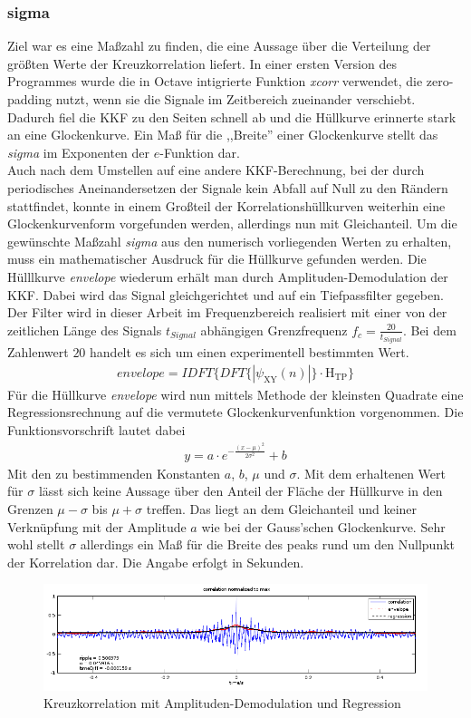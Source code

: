 \subsubsection{sigma}
Ziel war es eine Maßzahl zu finden, die eine Aussage über die Verteilung der größten Werte der Kreuzkorrelation liefert. In einer ersten Version des Programmes wurde die in Octave intigrierte Funktion \textit{xcorr} verwendet, die zero-padding nutzt, wenn sie die Signale im Zeitbereich zueinander verschiebt. Dadurch fiel die KKF zu den Seiten schnell ab und die Hüllkurve erinnerte stark an eine Glockenkurve. Ein Maß für die ,,Breite'' einer Glockenkurve stellt das \textit{sigma} im Exponenten der $e$-Funktion dar. 
\\Auch nach dem Umstellen auf eine andere KKF-Berechnung, bei der durch periodisches Aneinandersetzen der Signale kein Abfall auf Null zu den Rändern stattfindet, konnte in einem Großteil der Korrelationshüllkurven weiterhin eine Glockenkurvenform vorgefunden werden, allerdings nun mit Gleichanteil. Um die gewünschte Maßzahl \textit{sigma} aus den numerisch vorliegenden Werten zu erhalten, muss ein mathematischer Ausdruck für die Hüllkurve gefunden werden. Die Hülllkurve \textit{envelope} wiederum erhält man durch Amplituden-Demodulation der KKF. Dabei wird das Signal gleichgerichtet und auf ein Tiefpassfilter gegeben. Der Filter wird in dieser Arbeit im Frequenzbereich realisiert mit einer von der zeitlichen Länge des Signals $t_{Signal}$ abhängigen Grenzfrequenz $f_{c} = \frac{20}{t_{Signal}}$. Bei dem Zahlenwert $20$ handelt es sich um einen experimentell bestimmten Wert. 
\begin{align*}
envelope = IDFT\lbrace DFT\lbrace|\psi_{\text{XY}}(n)|\rbrace\cdot\text{H}_{\text{TP}}\rbrace
\end{align*}
Für die Hüllkurve \textit{envelope} wird nun mittels Methode der kleinsten Quadrate eine Regressionsrechnung auf die vermutete Glockenkurvenfunktion vorgenommen. Die Funktionsvorschrift lautet dabei
\begin{align*}
y = a\cdot e^{-\frac{(x-\mu)^2}{2\sigma^2}}+b
\end{align*}
Mit den zu bestimmenden Konstanten $a$, $b$, $\mu$ und $\sigma$. Mit dem erhaltenen Wert für $\sigma$ lässt sich keine Aussage über den Anteil der Fläche der Hüllkurve in den Grenzen $\mu-\sigma$ bis $\mu+\sigma$ treffen. Das liegt an dem Gleichanteil und keiner Verknüpfung mit der Amplitude $a$ wie bei der Gauss'schen Glockenkurve. Sehr wohl stellt $\sigma$ allerdings ein Maß für die Breite des peaks rund um den Nullpunkt der Korrelation dar. Die Angabe erfolgt in Sekunden. 
\begin{figure}[ht!]
\centering
\includegraphics[width=\textwidth, keepaspectratio=true]{img/lucas_von_flur_in_bad_m_(4s)+1s}
\caption{Kreuzkorrelation mit Amplituden-Demodulation und Regression}
\label{AM-Demodulation}
\end{figure}
